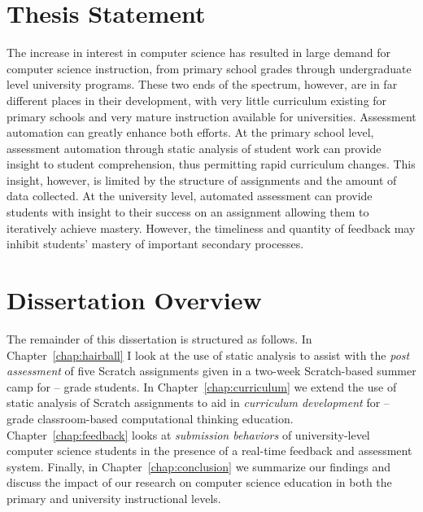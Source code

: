 \section{Thesis Statement}
The increase in interest in computer science has resulted in large demand for
computer science instruction, from primary school grades through undergraduate
level university programs. These two ends of the spectrum, however, are in far
different places in their development, with very little curriculum existing for
primary schools and very mature instruction available for
universities. Assessment automation can greatly enhance both efforts. At the
primary school level, assessment automation through static analysis of student
work can provide insight to student comprehension, thus permitting rapid
curriculum changes. This insight, however, is limited by the structure of
assignments and the amount of data collected. At the university level,
automated assessment can provide students with insight to their success on an
assignment allowing them to iteratively achieve mastery. However, the
timeliness and quantity of feedback may inhibit students' mastery of important
secondary processes.

\section{Dissertation Overview}
The remainder of this dissertation is structured as follows. In
Chapter~\ref{chap:hairball} I look at the use of static analysis to assist with
the \emph{post assessment} of five Scratch assignments given in a two-week
Scratch-based summer camp for -- grade students. In
Chapter~\ref{chap:curriculum} we extend the use of static analysis of Scratch
assignments to aid in \emph{curriculum development} for -- grade
classroom-based computational thinking education. Chapter~\ref{chap:feedback}
looks at \emph{submission behaviors} of university-level computer science
students in the presence of a real-time feedback and assessment
system. Finally, in Chapter~\ref{chap:conclusion} we summarize our findings and
discuss the impact of our research on computer science education in both the
primary and university instructional levels.
